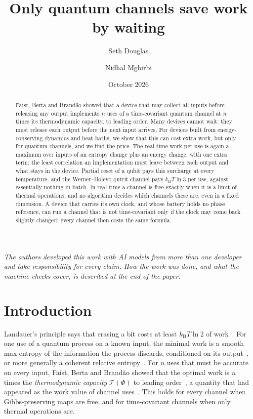 \documentclass[11pt]{article}
\title{Only quantum channels save work by waiting}
\author{Seth Douglas \and Nidhal Mghirbi}
\date{October 2026}
\theoremstyle{definition}
\theoremstyle{remark}
\newcommand{\kB}{k_{\mathrm B}}
\newcommand{\Tcap}{\mathcal T}
\begin{document}
\maketitle

\begin{abstract}
Faist, Berta and Brand\~ao showed that a device that may collect all inputs before releasing any output implements $n$ uses of a time-covariant quantum channel at $n$ times its thermodynamic capacity, to leading order. Many devices cannot wait: they must release each output before the next input arrives. For devices built from energy-conserving dynamics and heat baths, we show that this can cost extra work, but only for quantum channels, and we find the price. The real-time work per use is again a maximum over inputs of an entropy change plus an energy change, with one extra term: the least correlation an implementation must leave between each output and what stays in the device. Partial reset of a qubit pays this surcharge at every temperature, and the Werner--Holevo qutrit channel pays $\kB T\ln3$ per use, against essentially nothing in batch. In real time a channel is free exactly when it is a limit of thermal operations, and no algorithm decides which channels these are, even in a fixed dimension. A device that carries its own clock, and whose battery holds no phase reference, can run a channel that is not time-covariant only if the clock may come back slightly changed; every channel then costs the same formula.
\end{abstract}

\noindent\emph{The authors developed this work with AI models from more than one developer and take responsibility for every claim. How the work was done, and what the machine checks cover, is described at the end of the paper.}

{\small\tableofcontents}

\section{Introduction}\label{sec:intro}

Landauer's principle says that erasing a bit costs at least $\kB T\ln2$ of work~\cite{Landauer61}. For one use of a quantum process on a known input, the minimal work is a smooth max-entropy of the information the process discards, conditioned on its output~\cite{FDOR15}, or more generally a coherent relative entropy~\cite{FR18}. For $n$ uses that must be accurate on every input, Faist, Berta and Brand\~ao showed that the optimal work is $n$ times the \emph{thermodynamic capacity} $\Tcap(\Phi)$ to leading order~\cite{FBB19,FBB21}, a quantity that had appeared as the work value of channel uses~\cite{NGP15}. This holds for every channel when Gibbs-preserving maps are free, and for time-covariant channels when only thermal operations are.
\end{document}

